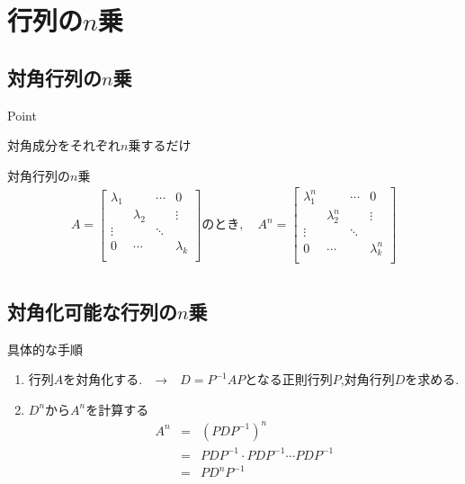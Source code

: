 \documentclass[a4paper]{jsarticle}
\begin{document}
\section{行列の$n$乗}
\subsection{対角行列の$n$乗}
\begin{itembox}[l]{Point}
    \begin{center}
        対角成分をそれぞれ$n$乗するだけ
    \end{center}
\end{itembox}
\begin{itembox}[l]{対角行列の$n$乗}
    \begin{eqnarray*}
        A=
        \begin{bmatrix}
            \lambda_1 &           & \cdots & 0         \\
                      & \lambda_2 &        & \vdots    \\
            \vdots    &           & \ddots &           \\
            0         & \cdots    &        & \lambda_k \\
        \end{bmatrix}
        のとき,\quad A^n=
        \begin{bmatrix}
            \lambda_1^n &             & \cdots & 0           \\
                        & \lambda_2^n &        & \vdots      \\
            \vdots      &             & \ddots &             \\
            0           & \cdots      &        & \lambda_k^n \\
        \end{bmatrix}\\
    \end{eqnarray*}
\end{itembox}
\subsection{対角化可能な行列の$n$乗}
\begin{itembox}[l]{具体的な手順}
    \begin{enumerate}
        \item 行列$A$を対角化する.　→　$D=P^{-1}AP$となる正則行列$P$,対角行列$D$を求める.
        \item $D^n$から$A^n$を計算する
              \begin{eqnarray*}
                  A^n
                  &=&\left(PDP^{-1}\right)^n\\
                  &=&PDP^{-1}\cdot PDP^{-1}\cdots PDP^{-1}\\
                  &=&PD^nP^{-1}\\
              \end{eqnarray*}
    \end{enumerate}
\end{itembox}
\end{document}
